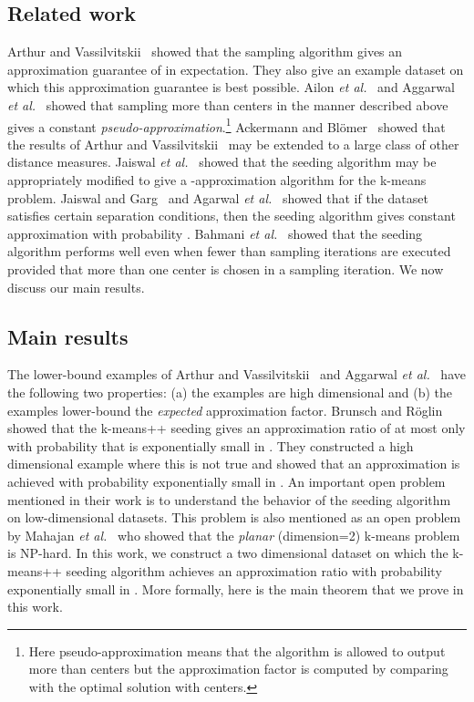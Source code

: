 \documentclass[11pt]{article}
\newcommand{\etal}{{\it et al.}}
\begin{document}
\subsection{Related work} 
Arthur and Vassilvitskii~\cite{ArthurV07} showed that the sampling algorithm gives an approximation guarantee of  in expectation. They also give an example dataset on which this approximation guarantee is best possible. Ailon \etal~\cite{AJMonteleoni09} and Aggarwal \etal~\cite{AggarwalDK09} showed that sampling more than  centers in the manner described above gives a constant {\em pseudo-approximation}.\footnote{Here pseudo-approximation means that the algorithm is allowed to output more than  centers but the approximation factor is computed by comparing with the optimal solution with  centers.}
Ackermann and Bl\"{o}mer~\cite{ab10} showed that the results of Arthur and Vassilvitskii~\cite{ArthurV07} may be extended to a large class of other distance measures. 
Jaiswal \etal~\cite{jks12} showed that the seeding algorithm may be appropriately modified to give a -approximation algorithm for the k-means problem. 
Jaiswal and Garg~\cite{jg12} and Agarwal \etal~\cite{ajp13} showed that if the dataset satisfies certain separation conditions, then the seeding algorithm gives constant approximation with probability . 
Bahmani \etal~\cite{b12} showed that the seeding algorithm performs well even when fewer than  sampling iterations are executed provided that more than one center is chosen in a sampling iteration.
We now discuss our main results.

\subsection{Main results}
The lower-bound examples of Arthur and Vassilvitskii~\cite{ArthurV07} and Aggarwal \etal~\cite{AggarwalDK09} have the following two properties: (a) the examples are high dimensional and (b) the examples lower-bound the {\em expected} approximation factor. 
Brunsch and R\"{o}glin~\cite{br12} showed that the k-means++ seeding gives  
an approximation ratio of at most  only with probability that is exponentially small in .
They constructed a high dimensional example where this is not true and showed that an  approximation is achieved with probability exponentially small in .
An important open problem mentioned in their work is to understand the behavior of the seeding algorithm on low-dimensional datasets. 
This problem is also mentioned as an open problem by Mahajan \etal~\cite{mnv12} who showed that the {\em planar} (dimension=2) k-means problem is NP-hard.
In this work, we construct a two dimensional dataset on which the k-means++ seeding algorithm achieves an approximation ratio  with probability exponentially small in . 
More formally, here is the main theorem that we prove in this work.
\end{document}
